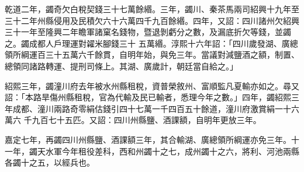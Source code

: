 \begin{pinyinscope}
 乾道二年，蠲奇欠白稅契錢三十七萬餘緡。三年，蠲川、秦茶馬兩司紹興十九年至三十二年州縣侵用及民積欠六十六萬四千九百餘緡。四年，又詔：四川諸州欠紹興三十一年至隆興二年瞻軍諸窠名錢物，暨退剝虧分之數，及漏底折欠等錢，並蠲之。蠲成都人戶理運對糴米腳錢三十
 五萬緡。淳熙十六年詔：「四川歲發湖、廣總領所綱運百三十五萬六千餘貫，自明年始，與免三年。當議對減鹽酒之額，制置、總領同諸路轉運、提刑司條上。其湖、廣歲計，朝廷當自給之。」



 紹熙三年，蠲潼川府去年被水州縣租稅，資普榮敘州、富順監凡夏輸亦如之。尋又詔：「本路旱傷州縣租稅，官為代輸及民已輸者，悉理今年之數。」四年，蠲紹熙三年成都、潼川兩路奇零絹估錢引四十七萬一千四百五十餘道，潼川府激賞絹一十六萬六
 千九百七十五匹。又詔：四川州縣鹽、酒課額，自明年更放三年。



 嘉定七年，再蠲四川州縣鹽、酒課額三年，其合輸湖、廣總領所綱運亦免三年。十一年，蠲天水軍今年租役差科，西和州蠲十之七，成州蠲十之六，將利、河池兩縣各蠲十之五，以經兵也。



\end{pinyinscope}